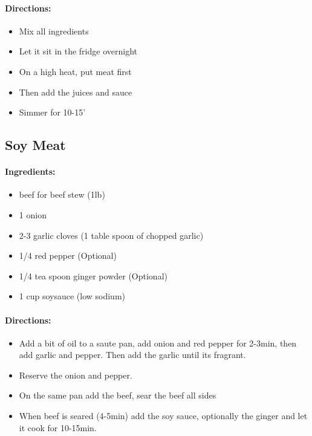 \documentclass{article}
\begin{document}
\paragraph{Directions:}
\begin{itemize}
	\item Mix all ingredients
	\item Let it sit in the fridge overnight
	\item On a high heat, put meat first
	\item Then add the juices and sauce
	\item Simmer for 10-15'
\end{itemize}

\subsection{Soy Meat}

\paragraph{Ingredients:}

\begin{itemize}
	\item beef for beef stew (1lb)
	\item 1 onion
	\item 2-3 garlic cloves (1 table spoon of chopped garlic)
	\item 1/4 red pepper (Optional)
	\item 1/4 tea spoon ginger powder (Optional)
	\item 1 cup soysauce (low sodium)
\end{itemize}

\paragraph{Directions:}
\begin{itemize}
	\item Add a bit of oil to a saute pan, add onion and red pepper for 2-3min, then add garlic and pepper. Then add the garlic until its fragrant.
	\item Reserve the onion and pepper.
	\item On the same pan add the beef, sear the beef all sides
	\item When beef is seared (4-5min) add the soy sauce, optionally the ginger and let it cook for 10-15min.
\end{itemize}
\end{document}
